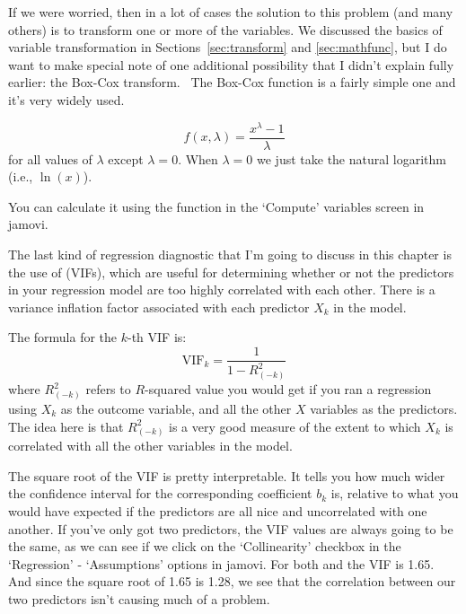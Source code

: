 If we were worried, then in a lot of cases the solution to this problem (and many others) is to transform one or more of the variables. We discussed the basics of variable transformation in Sections~\ref{sec:transform} and \ref{sec:mathfunc}, but I do want to make special note of one additional possibility that I didn't explain fully earlier: the Box-Cox transform.~\label{subsec:boxcox} The Box-Cox function is a fairly simple one and it's very widely used.

\vspace{0.5cm}
\begin{mdframed}[style=MyFrame,nobreak=true]
$$
f(x,\lambda) = \frac{x^\lambda - 1}{\lambda}
$$
for all values of $\lambda$ except $\lambda = 0$. When $\lambda = 0$ we just take the natural logarithm (i.e., $\ln(x)$). 
\end{mdframed}

You can calculate it using the  function in the `Compute' variables screen in jamovi. 



The last kind of regression diagnostic that I'm going to discuss in this chapter is the use of  (VIFs), which are useful for determining whether or not the predictors in your regression model are too highly correlated with each other. There is a variance inflation factor associated with each predictor $X_k$ in the model. 

\vspace{0.5cm}
\begin{mdframed}[style=MyFrame,nobreak=true]
The formula for the $k$-th VIF is:
$$
\mbox{VIF}_k = \frac{1}{1-{R^2_{(-k)}}}
$$
where $R^2_{(-k)}$ refers to $R$-squared value you would get if you ran a regression using $X_k$ as the outcome variable, and all the other $X$ variables as the predictors. The idea here is that $R^2_{(-k)}$ is a very good measure of the extent to which $X_k$ is correlated with all the other variables in the model. 
\end{mdframed}


The square root of the VIF is pretty interpretable. It tells you how much wider the confidence interval for the corresponding coefficient $b_k$ is, relative to what you would have expected if the predictors are all nice and uncorrelated with one another. If you've only got two predictors, the VIF values are always going to be the same, as we can see if we click on the `Collinearity' checkbox in the `Regression' - `Assumptions' options in jamovi. For both  and  the VIF is 1.65. And since the square root of 1.65 is 1.28, we see that the correlation between our two predictors isn't causing much of a problem. 

